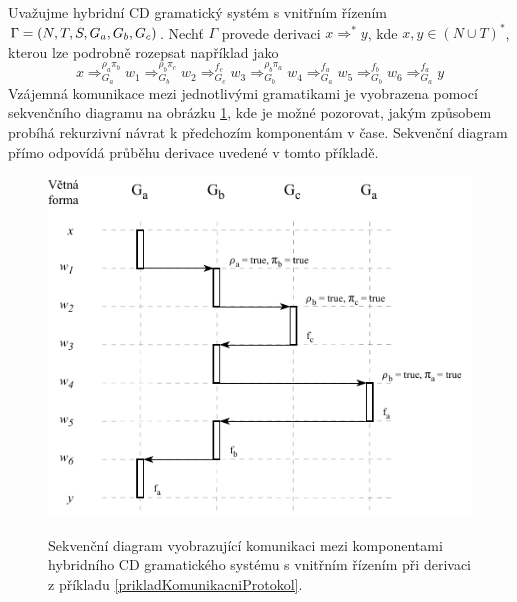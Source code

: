 \begin{priklad} \label{prikladKomunikacniProtokol}
  Uvažujme hybridní CD gramatický systém s vnitřním řízením $\Gamma = (N, T, S, G_a, \linebreak G_b, G_c)$. Nechť $\Gamma$ provede derivaci $x \Rightarrow^* y$, kde $x, y \in (N \cup T)^*$, kterou lze podrobně
  rozepsat například jako
  $$x \Rightarrow_{G_a}^{\rho_a\pi_b} w_1 \Rightarrow_{G_b}^{\rho_b\pi_c} w_2 \Rightarrow_{G_c}^{f_c} w_3 \Rightarrow_{G_b}^{\rho_b\pi_a} w_4 \Rightarrow_{G_a}^{f_a} w_5
  \Rightarrow_{G_b}^{f_b} w_6 \Rightarrow_{G_a}^{f_a} y$$
  Vzájemná komunikace mezi jednotlivými gramatikami je vyobrazena pomocí sekvenčního diagramu na obrázku \ref{obrSekvencniDiagramGS}, kde je možné pozorovat, jakým způsobem probíhá rekurzivní
  návrat k předchozím komponentám v čase. Sekvenční diagram přímo odpovídá průběhu derivace uvedené v tomto příkladě.
  \begin{figure}[h]\centering
    \centering
    \includegraphics[scale=1.35]{obrazky/SekvencniDiagramGS.pdf}\\[1pt]
    \caption{Sekvenční diagram vyobrazující komunikaci mezi komponentami hybridního CD gramatického systému s vnitřním řízením při derivaci z příkladu \ref{prikladKomunikacniProtokol}.}
    \label{obrSekvencniDiagramGS}
  \end{figure}
\end{priklad}

